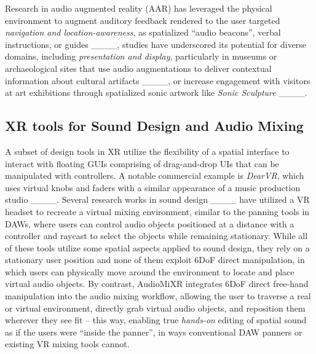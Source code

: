 Research in audio augmented reality (AAR) has leveraged the physical environment to augment auditory feedback rendered to the user targeted \emph{navigation and location-awareness}, as spatialized \enquote{audio beacons}, verbal instructions, or guides ____, studies have underscored its potential for diverse domains, including  \emph{presentation and display}, particularly in museums or archaeological sites that use audio augmentations to deliver contextual information about cultural artifacts ____, or increase engagement with visitors at art exhibitions through spatialized sonic artwork like \emph{Sonic Sculpture} ____. 

\subsection{XR tools for Sound Design and Audio Mixing}
 A subset of design tools in XR utilize the flexibility of a spatial interface to interact with floating GUIs comprising of drag-and-drop UIs that can be manipulated with controllers. A notable commercial example is \emph{DearVR}, which uses virtual knobs and faders with a similar appearance of a music production studio ____. Several research works in sound design ____ have utilized a VR headset to recreate a virtual mixing environment, similar to the panning tools in DAWs, where users can control audio objects positioned at a distance with a controller and raycast to select the objects while remaining stationary.%
 While all of these tools utilize some spatial aspects applied to sound design, they rely on a stationary user position and none of them exploit 6DoF direct manipulation, in which users can physically move around the environment to locate and place virtual audio objects. 
By contrast, AudioMiXR integrates 6DoF direct free-hand manipulation into the audio mixing workflow, allowing the user to traverse a real or virtual environment, directly grab virtual audio objects, and reposition them wherever they see fit -- this way, enabling true \emph{hands-on} editing of spatial sound as if the users were \enquote{inside the panner}, in ways conventional DAW panners or existing VR mixing tools cannot. 




